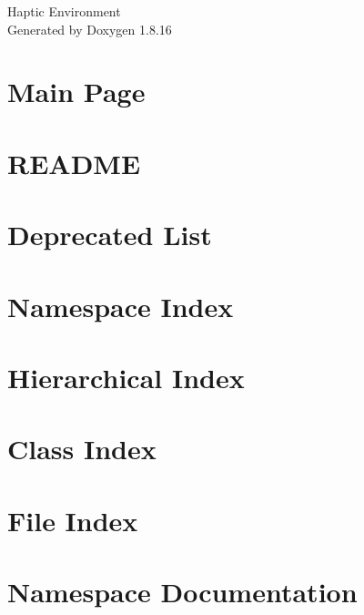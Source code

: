 \let\mypdfximage\pdfximage\def\pdfximage{\immediate\mypdfximage}\documentclass[twoside]{book}
\newcommand{\+}{\discretionary{\mbox{\scriptsize$\hookleftarrow$}}{}{}}
\newcommand{\clearemptydoublepage}{%
  \newpage{\pagestyle{empty}\cleardoublepage}%
}
\begin{document}
\hypersetup{pageanchor=false,
             bookmarksnumbered=true,
             pdfencoding=unicode
            }
\begin{titlepage}
\vspace*{7cm}
\begin{center}%
{\Large Haptic Environment }\\
\vspace*{1cm}
{\large Generated by Doxygen 1.8.16}\\
\end{center}
\end{titlepage}
\clearemptydoublepage
{}
\tableofcontents
\clearemptydoublepage
{}
\hypersetup{pageanchor=true}

\chapter{Main Page}
\label{index}\hypertarget{index}{}
\chapter{R\+E\+A\+D\+ME}
\label{md__home_mfl24__documents_chai_projects_haptic_environment__r_e_a_d_m_e}

\chapter{Deprecated List}
\label{deprecated}

\chapter{Namespace Index}

\chapter{Hierarchical Index}

\chapter{Class Index}

\chapter{File Index}

\chapter{Namespace Documentation}

\end{document}
